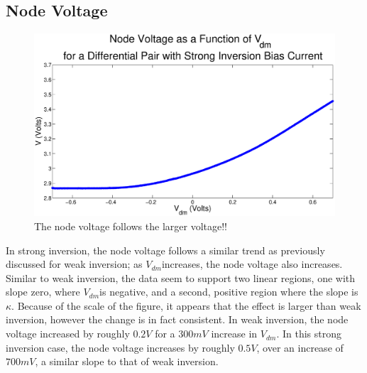 \documentclass{article}
\newcommand{\Vdm}{{$V_{dm}$}}
\begin{document}

\subsection*{Node Voltage}
\begin{figure}[H]
\centering
\includegraphics[width=\linewidth]{./Figures/NodeVoltageStrongInversion.eps}
\caption{The node voltage follows the larger voltage!!}
\label{fig:nodevoltageSI}
\end{figure}

In strong inversion, the node voltage follows a similar trend as previously discussed for weak inversion; as \Vdm increases, the node voltage also increases. Similar to weak inversion, the data seem to support two linear regions, one with slope zero, where \Vdm is negative, and a second, positive region where the slope is $\kappa$. Because of the scale of the figure, it appears that the effect is larger than weak inversion, however the change is in fact consistent. In weak inversion, the node voltage increased by roughly $0.2V$ for a $300mV$ increase in \Vdm. In this strong inversion case, the node voltage increases by roughly $0.5V$, over an increase of $700mV$, a similar slope to that of weak inversion. 
\end{document}
